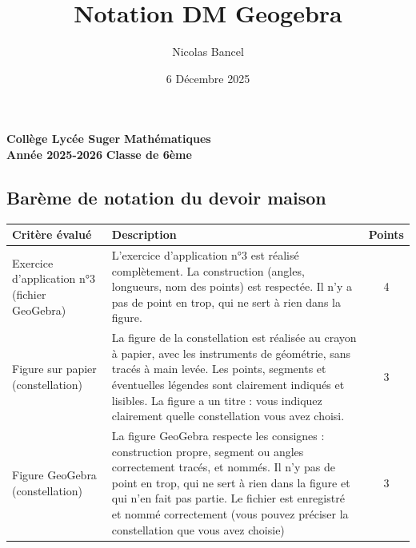 \documentclass[answers]{exam}
\title{Notation DM Geogebra}
\author{Nicolas Bancel}
\date{6 Décembre 2025}
\begin{document}
\textbf{Collège Lycée Suger}
\hfill
\textbf{Mathématiques} \\

\textbf{Année 2025-2026}
\hfill
\textbf{Classe de 6ème} \par

{\let\newpage\relax\maketitle}

\subsection*{Barème de notation du devoir maison}

\renewcommand{\arraystretch}{1.7}

{
  \setlength{\LTright}{0pt}    %

\centering
\begin{longtable}{|L{0.3\textwidth}|L{0.7\textwidth}|c|}
\hline
{}
\textbf{Critère évalué} & \textbf{Description} & \textbf{Points} \\[2pt]
\hline

  Exercice d'application n°3 (fichier GeoGebra)
  & L'exercice d'application n°3 est réalisé complètement. 
  La construction (angles, longueurs, nom des points) est respectée.
  Il n'y a pas de point en trop, qui ne sert à rien dans la figure.
  & 4 \\
\hline

  Figure sur papier (constellation)
  & La figure de la constellation est réalisée au crayon à papier, avec les instruments de géométrie, sans tracés à main levée.
  Les points, segments et éventuelles légendes sont clairement indiqués et lisibles.
  La figure a un titre : vous indiquez clairement quelle constellation vous avez choisi.
  & 3 \\
\hline

  Figure GeoGebra (constellation)
  & La figure GeoGebra respecte les consignes : construction propre, segment ou angles correctement tracés, et nommés.
  Il n'y pas de point en trop, qui ne sert à rien dans la figure et qui n'en fait pas partie. 
  Le fichier est enregistré et nommé correctement (vous pouvez préciser la constellation que vous avez choisie)
  & 3 \\[6pt]
\hline  


\end{longtable}}
\end{document}
